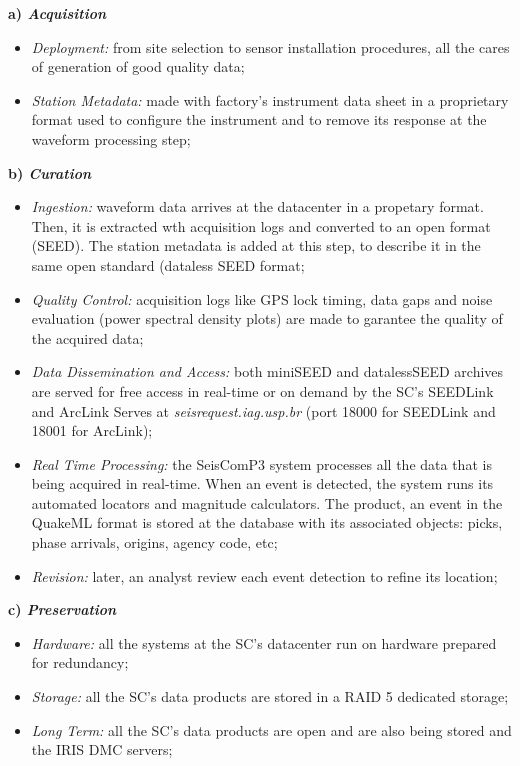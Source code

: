 \documentclass[twoside,letterpaper,twocolumn]{article}
\begin{document}
\textbf{a) \textit{Acquisition}}
\begin{itemize}
\item \textit{Deployment:} from site selection to sensor installation procedures, all the cares of generation of good quality data;
\item\textit{Station Metadata:} made with factory's instrument data sheet in a proprietary format used to configure the instrument and to remove its response at the waveform processing step;
\end{itemize}

\textbf{b) \textit{Curation}}
\begin{itemize}
\item \textit{Ingestion:} waveform data arrives at the datacenter in a propetary format. Then, it is extracted wth acquisition logs and converted to an open format (SEED). The station metadata is added at this step, to describe it in the same open standard (dataless SEED format;
\item \textit{Quality Control:} acquisition logs like GPS lock timing, data gaps and noise evaluation (power spectral density plots) are made to garantee the quality of the acquired data;
\item \textit{Data Dissemination and Access:} both miniSEED and datalessSEED archives are served for free access in real-time or on demand by the SC's SEEDLink and ArcLink Serves at \textit{seisrequest.iag.usp.br} (port 18000 for SEEDLink and 18001 for ArcLink);
\item \textit{Real Time Processing:} the SeisComP3 system processes all the data that is being acquired in real-time. When an event is detected, the system runs its automated locators and magnitude calculators. The product, an event in the QuakeML format is stored at the database with its associated objects: picks, phase arrivals, origins, agency code, etc;
\item \textit{Revision:} later, an analyst review each event detection to refine its location;
\end{itemize}

\textbf{c) \textit{Preservation}}
\begin{itemize}
\item \textit{Hardware:} all the systems at the SC's datacenter run on hardware prepared for redundancy;
\item\textit{Storage:} all the SC's data products are stored in a RAID 5 dedicated storage;
\item\textit{Long Term:} all the SC's data products are open and are also being stored and the IRIS DMC servers;
\end{itemize}
\end{document}
